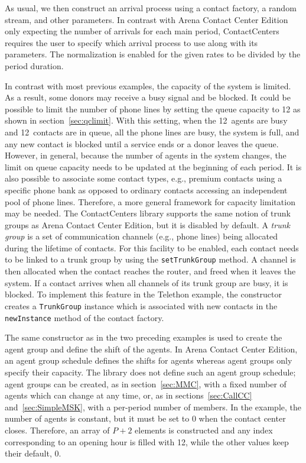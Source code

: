 As usual, we then construct an arrival process using a contact
factory, a random stream, and other parameters.
In contrast with Arena Contact Center Edition only expecting the
number of arrivals for each main period, ContactCenters requires the
user to specify which arrival process to use along with its
parameters.
The normalization is enabled for the given rates to be divided by the
period duration.

In contrast with most previous examples, the capacity of the system is
limited.  As a result, some donors may receive a busy signal and be
blocked.
It could be possible to limit the number of phone
lines by setting the queue capacity to 12 as shown in
section~\ref{sec:qclimit}.
With this setting, when the 12~agents are busy
and 12~contacts are in queue, all the phone lines are busy, the system
is full, and any new contact is blocked until a service ends or a donor
leaves the queue.  However, in
general, because the number of agents in the system changes, the limit
on queue capacity needs to be updated at the beginning of each period.
It is also
possible to associate some contact types, e.g., premium contacts using a
specific phone bank as opposed to ordinary contacts accessing an independent pool
of phone lines.  Therefore, a more general framework for capacity
limitation may be needed.
The ContactCenters library supports the same notion of
trunk groups as Arena Contact Center Edition, but it is disabled by
default.  A \emph{trunk group} is a set of communication channels
(e.g., phone lines)
being allocated during the lifetime of contacts.  For this facility
to be enabled, each contact needs to be linked to a trunk group by
using the \texttt{set\-Trunk\-Group} method.  A
channel is then allocated when the contact reaches the router, and
freed
when it leaves the system.  If a contact arrives when all channels of
its trunk group are busy, it is blocked.
To implement this feature
in the Telethon example, the constructor creates a
\texttt{Trunk\-Group} instance which is associated with new contacts in
the \texttt{new\-Instance} method of the contact factory.

The same constructor as in the two preceding examples is used to
create the agent group and define the shift of the agents.
In Arena Contact Center Edition, an agent group schedule defines the
shifts for agents whereas agent groups only specify their capacity.
The library does not define such an agent group schedule; agent groups
can be created, as in section~\ref{sec:MMC},
with a fixed number of agents which can change at any
time, or, as in sections~\ref{sec:CallCC} and~\ref{sec:SimpleMSK},
with a per-period number of members.
In the example, the number of agents is constant, but it must be set
to 0 when the
contact center closes.  Therefore, an array of $P+2$ elements is
constructed and any index corresponding to an opening hour is filled
with 12, while the other values keep their default, 0.

